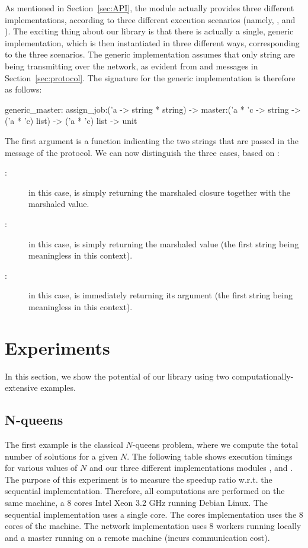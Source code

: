 \documentclass[preprint]{sigplanconf}
\begin{document}
As mentioned in Section~\ref{sec:API}, the  module
actually provides three different implementations, according to three
different execution scenarios (namely, ,  and
). The exciting thing about our library is that there is
actually a single, generic implementation, which is then instantiated
in three different ways, corresponding to the three scenarios.  The
generic implementation assumes that only string are being transmitting
over the network, as evident from  and 
messages in Section~\ref{sec:protocol}.  The signature for the generic
implementation is therefore as follows:
\begin{ocaml}
  generic_master:
    assign_job:('a -> string * string) ->
    master:('a * 'c -> string -> ('a * 'c) list)  ->
    ('a * 'c) list -> unit
\end{ocaml}
The first argument  is a function indicating the two
strings that are passed in the  message of the protocol.
We can now distinguish the three cases, based on :
\begin{description}
\item[:] in this case,  is simply returning
  the marshaled closure together with the marshaled value.
\item[:] in this case,  is simply
  returning the marshaled value (the first string being meaningless in
  this context).
\item[:] in this case,  is immediately
  returning its argument (the first string being meaningless in
  this context).
\end{description}

\section{Experiments}\label{sec:experiments}

In this section, we show the potential of our library using two 
computationally-extensive examples.

\subsection{N-queens}

The first example is the classical $N$-queens problem, where we
compute the total number of solutions for a given $N$.
The following table shows execution timings for various values of $N$
and our three different implementations modules ,  and
. The purpose of this experiment is to measure the speedup
ratio w.r.t. the sequential implementation. Therefore, all
computations are performed on the same machine, a 8 cores Intel Xeon
3.2 GHz running Debian Linux. The sequential implementation uses a
single core. The cores implementation uses the 8 cores of
the machine. The network implementation uses 8 workers running locally and
a master running on a remote machine (incurs communication cost).
\end{document}
